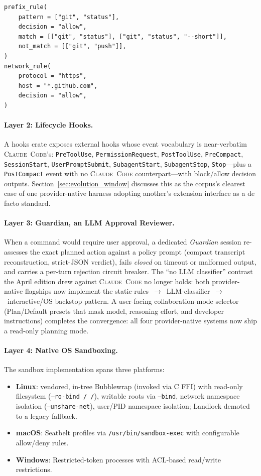 \documentclass[11pt,a4paper]{article}
\newcommand{\clcode}{\textsc{Claude~Code}\xspace}
\begin{document}
\begin{lstlisting}[caption={Codex execution policy example (Starlark).},label={lst:policy}]
prefix_rule(
    pattern = ["git", "status"],
    decision = "allow",
    match = [["git", "status"], ["git", "status", "--short"]],
    not_match = [["git", "push"]],
)
network_rule(
    protocol = "https",
    host = "*.github.com",
    decision = "allow",
)
\end{lstlisting}

\paragraph{Layer 2: Lifecycle Hooks.}
A hooks crate exposes external hooks whose event vocabulary is near-verbatim \clcode{}'s: \texttt{PreToolUse}, \texttt{PermissionRequest}, \texttt{PostToolUse}, \texttt{PreCompact}, \texttt{SessionStart}, \texttt{UserPromptSubmit}, \texttt{SubagentStart}, \texttt{SubagentStop}, \texttt{Stop}---plus a \texttt{PostCompact} event with no \clcode{} counterpart---with block/allow decision outputs.
Section~\ref{sec:evolution_window} discusses this as the corpus's clearest case of one provider-native harness adopting another's extension interface as a de facto standard.

\paragraph{Layer 3: Guardian, an LLM Approval Reviewer.}
When a command would require user approval, a dedicated \emph{Guardian} session re-assesses the exact planned action against a policy prompt (compact transcript reconstruction, strict-JSON verdict), fails \emph{closed} on timeout or malformed output, and carries a per-turn rejection circuit breaker.
The ``no LLM classifier'' contrast the April edition drew against \clcode{} no longer holds: both provider-native flagships now implement the static-rules~$\to$~LLM-classifier~$\to$~interactive/OS backstop pattern.
A user-facing collaboration-mode selector (Plan/Default presets that mask model, reasoning effort, and developer instructions) completes the convergence: all four provider-native systems now ship a read-only planning mode.

\paragraph{Layer 4: Native OS Sandboxing.}
The sandbox implementation spans three platforms:
\begin{itemize}[itemsep=1pt]
  \item \textbf{Linux}: vendored, in-tree Bubblewrap (invoked via C FFI) with read-only filesystem (\texttt{--ro-bind / /}), writable roots via \texttt{--bind}, network namespace isolation (\texttt{--unshare-net}), user/PID namespace isolation; Landlock demoted to a legacy fallback.
  \item \textbf{macOS}: Seatbelt profiles via \texttt{/usr/bin/sandbox-exec} with configurable allow/deny rules.
  \item \textbf{Windows}: Restricted-token processes with ACL-based read/write restrictions.
\end{itemize}
\end{document}
